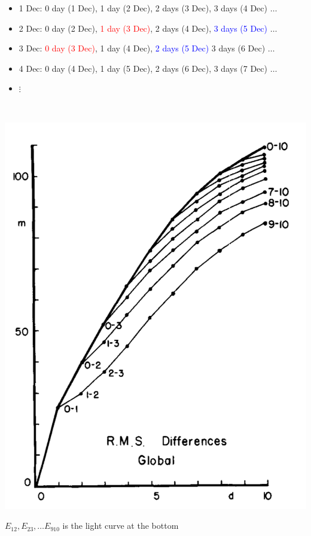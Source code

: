 \documentclass[aspectratio=169]{beamer}
\begin{document}
\begin{frame}
\frametitle{}

\begin{itemize}
\item 1 Dec: 0 day (1 Dec), 1 day (2 Dec), 2 days (3 Dec), 3 days (4 Dec) $\ldots$
\item 2 Dec: 0 day (2 Dec), \textcolor{red}{1 day (3 Dec)}, 2 days (4 Dec), \textcolor{blue}{3 days (5 Dec)} $\ldots$
\item 3 Dec: \textcolor{red}{0 day (3 Dec)}, 1 day (4 Dec), \textcolor{blue}{2 days (5 Dec)} 3 days (6 Dec) $\ldots$
\item 4 Dec: 0 day (4 Dec), 1 day (5 Dec), 2 days (6 Dec), 3 days (7 Dec) $\ldots$
\item $\vdots$
\end{itemize}

\pause
\vfill
{}  \\
 

\end{frame}
\begin{frame}

\begin{center}
\includegraphics[height = 0.8\textheight]{figures/lorenz_atmospheric_1982_fig1}
\end{center}

\vfill
$E_{12}, E_{23}, \ldots E_{910}$ is the light curve at the bottom

\end{frame}
\end{document}
